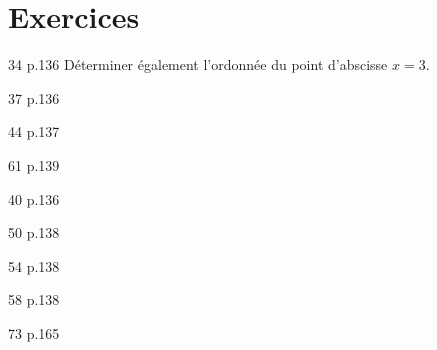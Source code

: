 \documentclass[10pt,a4paper,openany,twoside, prof]{book}
\begin{document}
\section*{Exercices}
\begin{exercices}
	\begin{bookexo}{34 p.136}
      Déterminer également l'ordonnée du point d'abscisse $x=3$.
   \end{bookexo}
   \begin{bookexo}{37 p.136}\end{bookexo}
   \begin{bookexo}{44 p.137}\end{bookexo}
   \begin{bookexo}{61 p.139}\end{bookexo}
   \begin{bookexo}{40 p.136}\end{bookexo}
   \begin{bookexo}{50 p.138}\end{bookexo}
   \begin{bookexo}{54 p.138}\end{bookexo}
   \begin{bookexo}{58 p.138}\end{bookexo}
   \begin{bookexo}{73 p.165}\end{bookexo}

\end{exercices}
\end{document}
